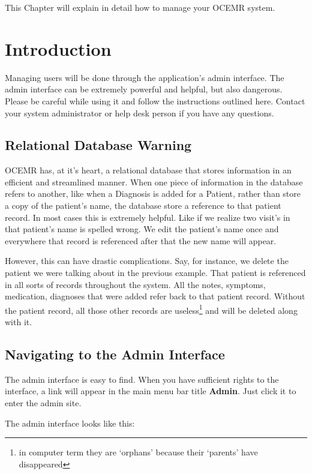 This Chapter will explain in detail how to manage your OCEMR system.

\section{Introduction}

Managing users will be done through the application’s admin interface.
The admin interface can be extremely powerful and helpful, but also
dangerous. Please be careful while using it and follow the instructions
outlined here. Contact your system administrator or help desk person if
you have any questions.

\subsection{Relational Database Warning}

  OCEMR has, at it’s heart, a relational database that stores information
in an efficient and streamlined manner. When one piece of information in
the database refers to another, like when a Diagnosis is added for a Patient,
rather than store a copy of the patient’s name, the database store a reference
to that patient record. In most cases this is extremely helpful. Like if we
realize two visit’s in that patient’s name is spelled wrong. We edit the
patient’s name once and everywhere that record is referenced after that the
new name will appear.

  However, this can have drastic complications. Say, for instance, we delete
the patient we were talking about in the previous example. That patient is
referenced in all sorts of records throughout the system. All the notes,
symptoms, medication, diagnoses that were added refer back to that patient
record. Without the patient record, all those other records are
useless\footnote{in computer term they are ‘orphans’ because their
‘parents’ have disappeared} and will be deleted along with it.

\subsection{Navigating to the Admin Interface}

The admin interface is easy to find. When you have sufficient rights
to the interface, a link will appear in the main menu bar title \textbf{Admin}.
Just click it to enter the admin site.

  The admin interface looks like this:

